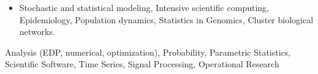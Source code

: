\medskip

\begin{itemize}
\item 
    Stochastic and statistical modeling, 
    Intensive scientific computing,
    Epidemiology, 
    Population dynamics,
    Statistics in Genomics,
    Cluster biological networks.
\end{itemize}
\medskip

    Analysis (EDP, numerical, optimization), Probability, Parametric Statistics, Scientific Software, Time Series, Signal Processing, Operational Research
\medskip

\medskip








% 
% 
%   

